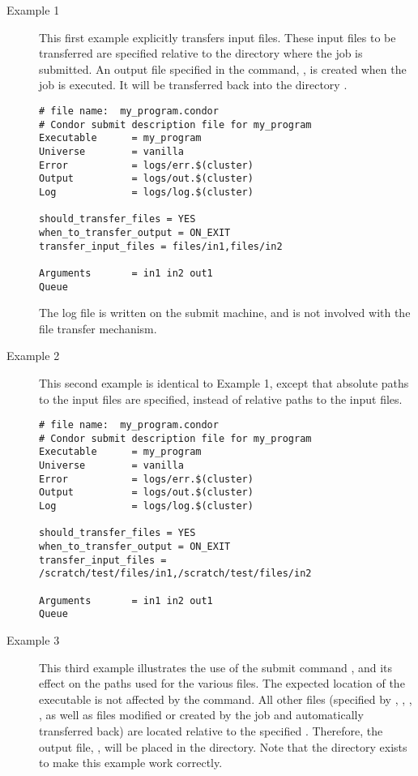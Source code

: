 \begin{description}
\item[Example 1]

This first example explicitly transfers input files.
These input files to be transferred
are specified relative to the directory where the job is submitted.
An output file specified in the  command, ,
is created when the job is executed.
It will be transferred back into the directory .

\footnotesize
\begin{verbatim}
# file name:  my_program.condor
# Condor submit description file for my_program
Executable      = my_program
Universe        = vanilla
Error           = logs/err.$(cluster)
Output          = logs/out.$(cluster)
Log             = logs/log.$(cluster)

should_transfer_files = YES
when_to_transfer_output = ON_EXIT
transfer_input_files = files/in1,files/in2

Arguments       = in1 in2 out1
Queue
\end{verbatim}
\normalsize

The log file is written on the submit machine, and is not involved
with the file transfer mechanism.
\item[Example 2]

This second example is identical to Example 1,
except that absolute paths to the input files are specified,
instead of relative paths to the input files.

\footnotesize
\begin{verbatim}
# file name:  my_program.condor
# Condor submit description file for my_program
Executable      = my_program
Universe        = vanilla
Error           = logs/err.$(cluster)
Output          = logs/out.$(cluster)
Log             = logs/log.$(cluster)

should_transfer_files = YES
when_to_transfer_output = ON_EXIT
transfer_input_files = /scratch/test/files/in1,/scratch/test/files/in2

Arguments       = in1 in2 out1
Queue
\end{verbatim}
\normalsize

\item[Example 3]

This third example illustrates the use of the 
submit command , and its effect
on the paths used for the various files.
The expected location of the 
executable is not affected by the 
 command.
All other files
(specified by , , ,
,
as well as files modified or created by the job
and automatically transferred back)
are located relative to the specified .
Therefore, the output file, ,
will be placed in the \verb@files@ directory.
Note that the  directory
exists to make this example work correctly.


\end{description}
